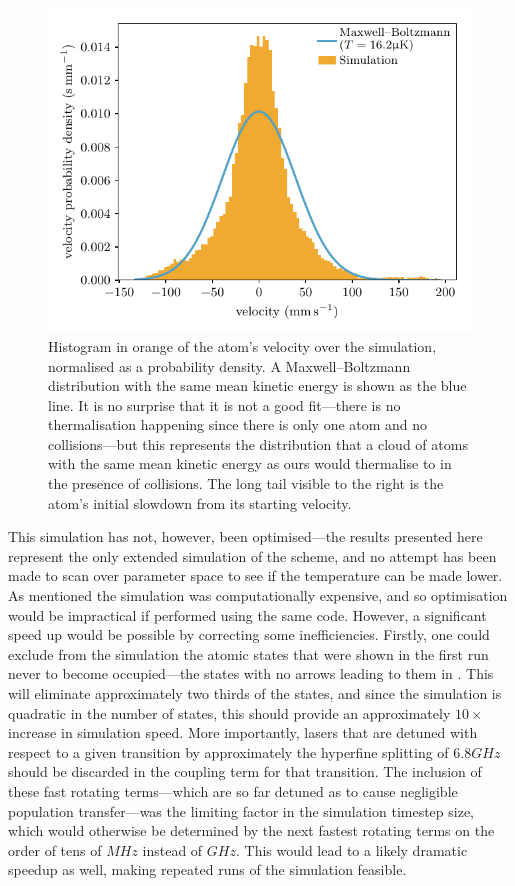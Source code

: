 \begin{figure}
\begin{center}
\includegraphics[width=\textwidth]{figures/velocimetry/laser_cooling_results.pdf}
\caption{\label{fig:cold_atom} Histogram in orange of the atom's velocity over the simulation, normalised as a probability density. A Maxwell--Boltzmann distribution with the same mean kinetic energy is shown as the blue line. It is no surprise that it is not a good fit---there is no thermalisation happening since there is only one atom and no collisions---but this represents the distribution that a cloud of atoms with the same mean kinetic energy as ours would thermalise to in the presence of collisions. The long tail visible to the right is the atom's initial slowdown from its starting velocity.}
\end{center}
\end{figure}

This simulation has not, however, been optimised---the results presented here represent the only extended simulation of the scheme, and no attempt has been made to scan over parameter space to see if the temperature can be made lower. As mentioned the simulation was computationally expensive, and so optimisation would be impractical if performed using the same code. However, a significant speed up would be possible by correcting some inefficiencies. Firstly, one could exclude from the simulation the atomic states that were shown in the first run never to become occupied---the states with no arrows leading to them in . This will eliminate approximately two thirds of the states, and since the simulation is quadratic in the number of states, this should provide an approximately $10\times$ increase in simulation speed. More importantly, lasers that are detuned with respect to a given transition by approximately the hyperfine splitting of $6.8\unit{GHz}$ should be discarded in the coupling term for that transition. The inclusion of these fast rotating terms---which are so far detuned as to cause negligible population transfer---was the limiting factor in the simulation timestep size, which would otherwise be determined by the next fastest rotating terms on the order of tens of $\unit{MHz}$ instead of $\unit{GHz}$. This would lead to a likely dramatic speedup as well, making repeated runs of the simulation feasible.

